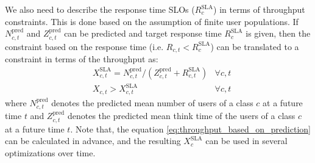    We also need to describe the response time SLOs ($R_{c}^\text{SLA}$) in terms of throughput constraints. 
 This is done based on the assumption of finite user populations. If $N^{\text{pred}}_{c,t}$ and $Z^{\text{pred}}_{c,t}$ can be predicted and target response time $R_{c}^\text{SLA}$ is given, then the constraint based on the response time (i.e. $R_{c,t} < R_{c}^\text{SLA}$) can be translated to a constraint in terms of the throughput as:
\begin{align}
	& X_{c,t}^\text{SLA}=N^{\text{pred}}_{c,t}/(Z^{\text{pred}}_{c,t}+  R_{c,t}^\text{SLA})  & \forall  c,t  \label{eq:throughput_based_on_prediction}  \\ 
& X_{c,t}>X_{c,t}^\text{SLA}  & \forall c,t 
\end{align}
where $N^{\text{pred}}_{c,t}$ denotes the predicted mean number of users of a class $c$ at a future time $t$ and $Z^{\text{pred}}_{c,t}$ denotes the predicted mean think time of the users of a class $c$ at a future time $t$.  
Note that, the equation \ref{eq:throughput_based_on_prediction} can be calculated in advance, and the resulting $X_{c}^\text{SLA}$ can be used in several optimizations over time. 
 
